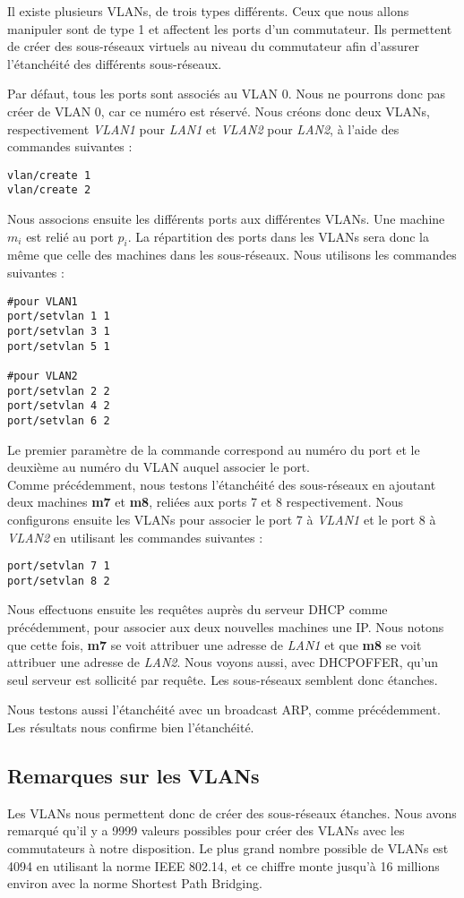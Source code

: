 \documentclass{article}
\begin{document}
Il existe plusieurs VLANs, de trois types différents. Ceux que nous allons manipuler sont de type 1 et affectent les ports d'un commutateur. Ils permettent de créer des sous-réseaux virtuels au niveau du commutateur afin d'assurer l'étanchéité des différents sous-réseaux.

Par défaut, tous les ports sont associés au VLAN 0. Nous ne pourrons donc pas créer de VLAN 0, car ce numéro est réservé. Nous créons donc deux VLANs, respectivement \textit{VLAN1} pour \textit{LAN1} et \textit{VLAN2} pour \textit{LAN2}, à l'aide des commandes suivantes :
\begin{verbatim}
vlan/create 1
vlan/create 2
\end{verbatim}

Nous associons ensuite les différents ports aux différentes VLANs. Une machine $m_i$ est relié au port $p_i$. La répartition des ports dans les VLANs sera donc la même que celle des machines dans les sous-réseaux. Nous utilisons les commandes suivantes :
\begin{verbatim}
#pour VLAN1
port/setvlan 1 1
port/setvlan 3 1
port/setvlan 5 1

#pour VLAN2
port/setvlan 2 2
port/setvlan 4 2
port/setvlan 6 2
\end{verbatim}

Le premier paramètre de la commande correspond au numéro du port et le deuxième au numéro du VLAN auquel associer le port. \\

Comme précédemment, nous testons l'étanchéité des sous-réseaux en ajoutant deux machines \textbf{m7} et \textbf{m8}, reliées aux ports 7 et 8 respectivement. Nous configurons ensuite les VLANs pour associer le port 7 à \textit{VLAN1} et le port 8 à \textit{VLAN2} en utilisant les commandes suivantes :
\begin{verbatim}
port/setvlan 7 1
port/setvlan 8 2
\end{verbatim} \newpage

Nous effectuons ensuite les requêtes auprès du serveur DHCP comme précédemment, pour associer aux deux nouvelles machines une IP. Nous notons que cette fois, \textbf{m7} se voit attribuer une adresse de \textit{LAN1} et que \textbf{m8} se voit attribuer une adresse de \textit{LAN2}. Nous voyons aussi, avec DHCPOFFER, qu'un seul serveur est sollicité par requête. Les sous-réseaux semblent donc étanches.

Nous testons aussi l'étanchéité avec un broadcast ARP, comme précédemment. Les résultats nous confirme bien l'étanchéité.

\subsection{Remarques sur les VLANs}

Les VLANs nous permettent donc de créer des sous-réseaux étanches. Nous avons remarqué qu'il y a 9999 valeurs possibles pour créer des VLANs avec les commutateurs à notre disposition. Le plus grand nombre possible de VLANs est 4094 en utilisant la norme IEEE 802.14, et ce chiffre monte jusqu'à 16 millions environ avec la norme Shortest Path Bridging.
\end{document}
